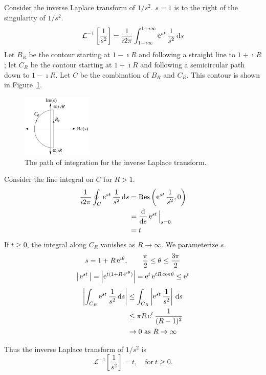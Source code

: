 \begin{Example}
  Consider the inverse Laplace transform of $1/s^2$.  
  $s=1$ is to the right of the singularity of $1/s^2$.
  \[
  \mathcal{L}^{-1}\left[ \frac{1}{s^2} \right]
  = \frac{1}{\imath 2 \pi} \int_{1 - \imath \infty}^{1 + \imath \infty} \mathop{\mathrm{e}}\nolimits^{s t} \frac{1}{s^2} \,\mathrm{d} s 
  \]
  Let $B_R$ be the contour starting at $1 - \imath R$ and following a straight line
  to $1 + \imath R$;
  let $C_R$ be the contour starting at $1 + \imath R$ and following a semicircular
  path down to $1 - \imath R$.
  Let $C$ be the combination of $B_R$ and $C_R$.
  This contour is shown in Figure~\ref{bromwich1}. 


  \begin{figure}[h!]
    \begin{center}
        \includegraphics[width=0.3\textwidth]{ode/laplace/ooss}
      \caption{The path of integration for the inverse Laplace transform.}
      \label{bromwich1}
    \end{center}
  \end{figure}


  Consider the line integral on $C$ for $R > 1$.
  \begin{align*}
    \frac{1}{\imath 2 \pi}\oint_C \mathop{\mathrm{e}}\nolimits^{s t} \frac{1}{s^2}\,\mathrm{d} s
    &= \mathop{\mathrm{Res}}\nolimits\left( \mathop{\mathrm{e}}\nolimits^{s t} \frac{1}{s^2}, 0 \right) \\
    &= \frac{\mathrm{d}}{\mathrm{d} s} \mathop{\mathrm{e}}\nolimits^{s t}\Big|_{s=0} \\
    &= t
  \end{align*}
  If $t \geq 0$, the integral along $C_R$ vanishes as $R \to \infty$.
  We parameterize $s$.
  \begin{gather*}
    s = 1 + R \mathop{\mathrm{e}}\nolimits^{\imath \theta}, \qquad \frac{\pi}{2} \leq \theta \leq \frac{3\pi}{2} \\
    \big| \mathop{\mathrm{e}}\nolimits^{s t} \big| = \left| \mathop{\mathrm{e}}\nolimits^{t(1 + R \mathop{\mathrm{e}}\nolimits^{\imath \theta})} \right|
    = \mathop{\mathrm{e}}\nolimits^t \mathop{\mathrm{e}}\nolimits^{t R \cos \theta} \leq \mathop{\mathrm{e}}\nolimits^t
  \end{gather*}
  \begin{align*}
    \left|\int_{C_R} \mathop{\mathrm{e}}\nolimits^{s t} \frac{1}{s^2}\,\mathrm{d} s \right|
    &\leq \int_{C_R} \left| \mathop{\mathrm{e}}\nolimits^{s t} \frac{1}{s^2}\right| \,\mathrm{d} s \\
    &\leq \pi R \mathop{\mathrm{e}}\nolimits^t \frac{1}{(R-1)^2} \\
    &\to 0\ \mathrm{as}\ R \to \infty
  \end{align*}

  Thus the inverse Laplace transform of $1/s^2$ is
  \[ 
  \boxed{
    \mathcal{L}^{-1}\left[\frac{1}{s^2}\right] = t, 
    \quad \mathrm{for}\ t \geq 0.
    }
  \]
\end{Example}







